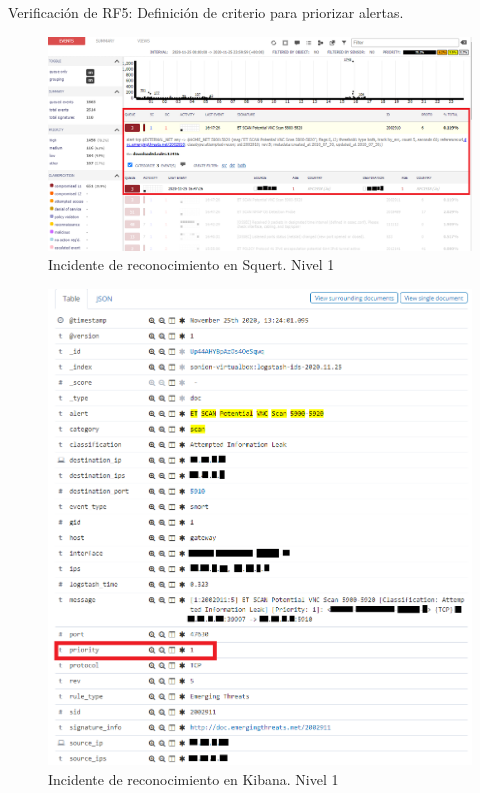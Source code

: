 \begin{section}{Verificación de RF5: Definición de criterio para priorizar alertas.}
    \begin{figure}[H]
    \centering
    \includegraphics[width=1\textwidth]{./iteracion_3_imagenes/squert_ataque_vnc_L1-EDITADO.png}
    \caption{Incidente de reconocimiento en Squert. Nivel 1}
    \label{fig:squert-L1}
    \end{figure}
    \begin{figure}[H]
    \centering
    \includegraphics[width=1\textwidth]{./iteracion_3_imagenes/kibana_ataques_L2_2-EDITADO.png}
    \caption{Incidente de reconocimiento en Kibana. Nivel 1}
    \label{fig:kibana-L1}
    \end{figure}
    
    \end{section}
